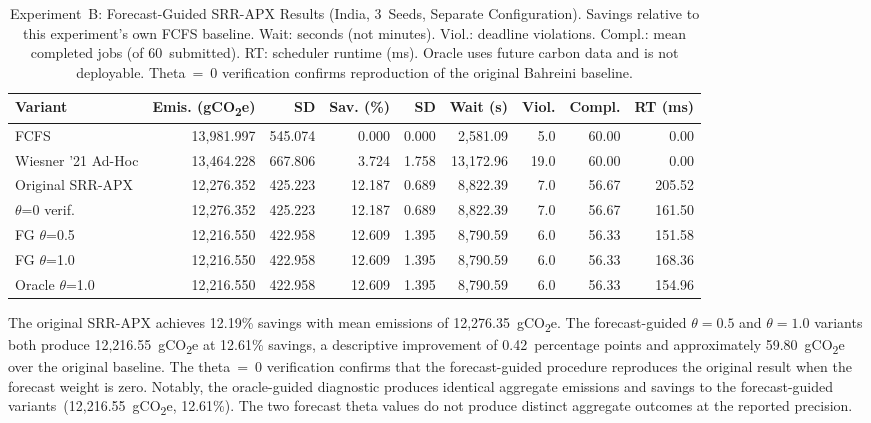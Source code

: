 \documentclass[conference]{IEEEtran}
\begin{document}
\begin{table}[t]
\caption{Experiment~B: Forecast-Guided SRR-APX Results (India, 3~Seeds, Separate Configuration).\newline
\footnotesize Savings relative to this experiment's own FCFS baseline. Wait: seconds (not minutes).
Viol.: deadline violations. Compl.: mean completed jobs (of 60~submitted). RT: scheduler runtime (ms).
Oracle uses future carbon data and is not deployable. Theta~=~0 verification confirms reproduction
of the original Bahreini baseline.}
\label{tab:forecast}
\centering
\footnotesize
\begin{tabular}{@{}lrrrrrrrr@{}}
\toprule
\textbf{Variant} &
  \textbf{Emis. (gCO\textsubscript{2}e)} & \textbf{SD} &
  \textbf{Sav. (\%)} & \textbf{SD} &
  \textbf{Wait (s)} & \textbf{Viol.} & \textbf{Compl.} & \textbf{RT (ms)} \\
\midrule
FCFS                 & 13{,}981.997 & 545.074 & 0.000 & 0.000 & 2{,}581.09 &  5.0 & 60.00 &   0.00 \\
Wiesner '21 Ad-Hoc   & 13{,}464.228 & 667.806 & 3.724 & 1.758 & 13{,}172.96 & 19.0 & 60.00 &   0.00 \\
Original SRR-APX     & 12{,}276.352 & 425.223 & 12.187 & 0.689 & 8{,}822.39 &  7.0 & 56.67 & 205.52 \\
$\theta$=0 verif.    & 12{,}276.352 & 425.223 & 12.187 & 0.689 & 8{,}822.39 &  7.0 & 56.67 & 161.50 \\
FG $\theta$=0.5      & 12{,}216.550 & 422.958 & 12.609 & 1.395 & 8{,}790.59 &  6.0 & 56.33 & 151.58 \\
FG $\theta$=1.0      & 12{,}216.550 & 422.958 & 12.609 & 1.395 & 8{,}790.59 &  6.0 & 56.33 & 168.36 \\
Oracle $\theta$=1.0  & 12{,}216.550 & 422.958 & 12.609 & 1.395 & 8{,}790.59 &  6.0 & 56.33 & 154.96 \\
\bottomrule
\end{tabular}
\end{table}

The original SRR-APX achieves 12.19\% savings with mean emissions of
12,276.35~gCO\textsubscript{2}e. The forecast-guided $\theta=0.5$ and
$\theta=1.0$ variants both produce 12,216.55~gCO\textsubscript{2}e at 12.61\%
savings, a descriptive improvement of 0.42~percentage points and
approximately 59.80~gCO\textsubscript{2}e over the original baseline. The
theta~=~0 verification confirms that the forecast-guided procedure reproduces
the original result when the forecast weight is zero. Notably, the
oracle-guided diagnostic produces identical aggregate emissions and savings to
the forecast-guided variants~(12,216.55~gCO\textsubscript{2}e, 12.61\%). The
two forecast theta values do not produce distinct aggregate outcomes at the
reported precision.
\end{document}

